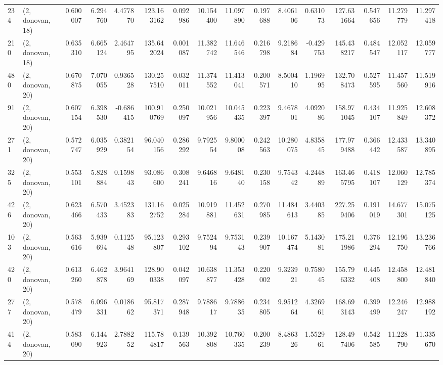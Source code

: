 \begin{tabular}{llrrrrrrrrrrrrrr}
234 &  (2, donovan, 18) &   0.600007 &   6.294760 &   4.477870 &   123.163162 &   0.092986 &  10.154400 &  11.097890 &  0.197688 &   8.406106 &   0.631073 &   127.631664 &  0.547656 &  11.279779 &  11.297418 \\
210 &  (2, donovan, 18) &   0.635310 &   6.665124 &   2.464795 &   135.642024 &   0.001087 &  11.382742 &  11.646546 &  0.216798 &   9.218684 &  -0.429753 &   145.438217 &  0.484547 &  12.052117 &  12.059777 \\
480 &  (2, donovan, 20) &   0.670875 &   7.070055 &   0.936528 &   130.257510 &   0.032011 &  11.374552 &  11.413041 &  0.200571 &   8.500410 &   1.196995 &   132.708473 &  0.527595 &  11.457560 &  11.519916 \\
91  &  (2, donovan, 20) &   0.607154 &   6.398530 &  -0.686415 &   100.910769 &   0.250097 &  10.021956 &  10.045435 &  0.223397 &   9.467801 &   4.092086 &   158.971045 &  0.434107 &  11.925849 &  12.608372 \\
271 &  (2, donovan, 20) &   0.572747 &   6.035929 &   0.382154 &    96.040156 &   0.286292 &   9.792554 &   9.800008 &  0.242563 &  10.280075 &   4.835845 &   177.979488 &  0.366442 &  12.433587 &  13.340895 \\
325 &  (2, donovan, 20) &   0.553101 &   5.828884 &   0.159843 &    93.086600 &   0.308241 &   9.646816 &   9.648140 &  0.230158 &   9.754342 &   4.244889 &   163.465795 &  0.418107 &  12.060129 &  12.785374 \\
426 &  (2, donovan, 20) &   0.623466 &   6.570433 &   3.452383 &   131.162752 &   0.025284 &  10.919881 &  11.452631 &  0.270985 &  11.484613 &   3.440385 &   227.259406 &  0.191019 &  14.677301 &  15.075125 \\
103 &  (2, donovan, 20) &   0.563616 &   5.939694 &   0.112548 &    95.123807 &   0.293102 &   9.752494 &   9.753143 &  0.239907 &  10.167474 &   5.143081 &   175.211986 &  0.376294 &  12.196750 &  13.236766 \\
420 &  (2, donovan, 20) &   0.613260 &   6.462878 &   3.964169 &   128.900338 &   0.042097 &  10.638877 &  11.353428 &  0.220002 &   9.323921 &   0.758045 &   155.796332 &  0.445408 &  12.458800 &  12.481840 \\
277 &  (2, donovan, 20) &   0.578479 &   6.096331 &   0.018662 &    95.817371 &   0.287948 &   9.788617 &   9.788635 &  0.234805 &   9.951264 &   4.326961 &   168.693143 &  0.399499 &  12.246247 &  12.988192 \\
414 &  (2, donovan, 20) &   0.583090 &   6.144923 &   2.788252 &   115.784817 &   0.139563 &  10.392808 &  10.760335 &  0.200239 &   8.486326 &   1.552961 &   128.497406 &  0.542585 &  11.228790 &  11.335670 \\

\end{tabular}
